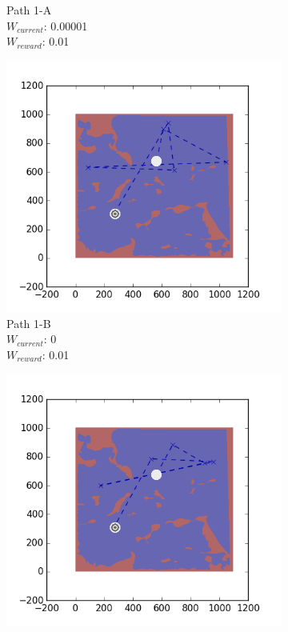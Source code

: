 \documentclass{tamuccthesis}
\begin{document}
\begin{figure}[H]
\begin{subfigure}[b]{0.24\textwidth}
        \caption{{\small Path 1-A \\ $W_{current}$: 0.00001 \\ $W_{reward}$: 0.01}}
        \label{fig:Path_1-A_upReward_Work}
    \end{subfigure}
    \begin{subfigure}[b]{0.24\textwidth}
        \centering
        \includegraphics[width=\textwidth,trim={4cm 3cm 2cm 3cm},clip]{EXP3RG_PathAb_-1_-1_0_0d01.png}
        \caption{{\small Path 1-B \\ $W_{current}$: 0 \\ $W_{reward}$: 0.01}}
        \label{fig:Path_1-B_upReward_noWork}
    \end{subfigure}
    \begin{subfigure}[b]{0.24\textwidth}  
        \centering 
        \includegraphics[width=\textwidth,trim={4cm 3cm 2cm 3cm},clip]{EXP3RG_PathAb_-1_-1_-1_0d01.png}

\end{subfigure}
\end{figure}
\end{document}
